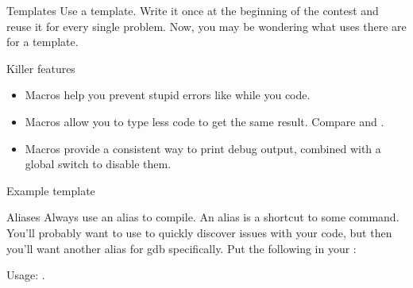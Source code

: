 \documentclass[handout,code=programming-tricks,title={Efficient
  implementation and debugging}]{../share/cpslide}
\begin{document}
\begin{frame}{Templates}
  Use a template. Write it once at the beginning of the contest and reuse it for
  every single problem. Now, you may be wondering what uses there are for a template.
  \begin{info}{Killer features}
    \begin{itemize}
    \item Macros help you prevent stupid errors like
       while you code.
    \item Macros allow you to type less code to get the same result. Compare
       and
      .
    \item Macros provide a consistent way to print debug output, combined with a
      global switch to disable them.
    \end{itemize}
  \end{info}
\end{frame}

\begin{frame}{Example template}
\end{frame}

\begin{frame}{Aliases}
  Always use an alias to compile. An alias is a shortcut to some command. You'll
  probably want to use  to quickly discover
  issues with your code, but then you'll want another alias for gdb specifically.
  Put the following in your :
  
  Usage: .
\end{frame}
\end{document}
